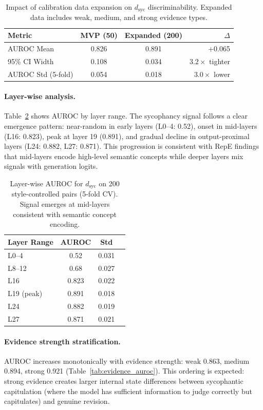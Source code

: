 \documentclass[11pt,a4paper]{article}
\newcommand{\dsyc}{d_{\text{syc}}}
\begin{document}
\begin{table}[t]
\centering
\small
\begin{tabular}{lccr}
\toprule
\textbf{Metric} & \textbf{MVP (50)} & \textbf{Expanded (200)} & \textbf{$\Delta$} \\
\midrule
AUROC Mean & 0.826 & 0.891 & +0.065 \\
95\% CI Width & 0.108 & 0.034 & $3.2\times$ tighter \\
AUROC Std (5-fold) & 0.054 & 0.018 & $3.0\times$ lower \\
\bottomrule
\end{tabular}
\caption{Impact of calibration data expansion on $\dsyc$ discriminability. Expanded data includes weak, medium, and strong evidence types.}
\label{tab:data_expansion}
\end{table}

\paragraph{Layer-wise analysis.}
Table~\ref{tab:layer_auroc} shows AUROC by layer range. The sycophancy signal follows a clear emergence pattern: near-random in early layers (L0--4: 0.52), onset in mid-layers (L16: 0.823), peak at layer 19 (0.891), and gradual decline in output-proximal layers (L24: 0.882, L27: 0.871). This progression is consistent with RepE findings that mid-layers encode high-level semantic concepts while deeper layers mix signals with generation logits.

\begin{table}[t]
\centering
\small
\begin{tabular}{lccc}
\toprule
\textbf{Layer Range} & \textbf{AUROC} & \textbf{Std} \\
\midrule
L0--4 & 0.52 & 0.031 \\
L8--12 & 0.68 & 0.027 \\
L16 & 0.823 & 0.022 \\
L19 (peak) & 0.891 & 0.018 \\
L24 & 0.882 & 0.019 \\
L27 & 0.871 & 0.021 \\
\bottomrule
\end{tabular}
\caption{Layer-wise AUROC for $\dsyc$ on 200 style-controlled pairs (5-fold CV). Signal emerges at mid-layers consistent with semantic concept encoding.}
\label{tab:layer_auroc}
\end{table}

\paragraph{Evidence strength stratification.}
AUROC increases monotonically with evidence strength: weak 0.863, medium 0.894, strong 0.921 (Table~\ref{tab:evidence_auroc}). This ordering is expected: strong evidence creates larger internal state differences between sycophantic capitulation (where the model has sufficient information to judge correctly but capitulates) and genuine revision.
\end{document}
